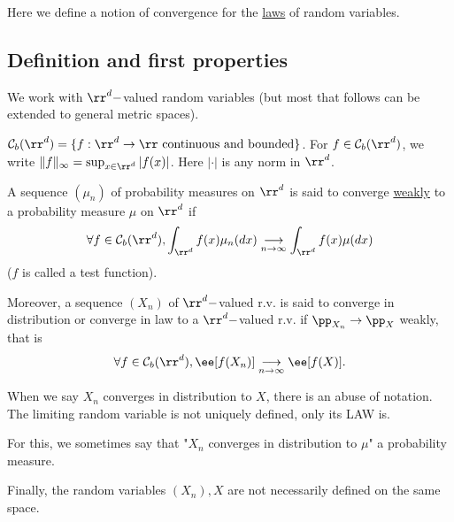 \documentclass[../main.tex]{subfiles}
\begin{document}
Here we define a notion of convergence for the \underline{laws} of random
variables.


\subsection{Definition and first properties}

We work with $\rr^d-$valued random variables (but most that follows can be
extended to general metric spaces).

\begin{notation}
  $\mathcal{C}_b(\rr^d) = \{ f: \rr^d \to \rr \text{ continuous and bounded}\}
  $. For $f \in \mathcal{C}_b(\rr^d)$, we write $\| f \|_{\infty} = \sup_{x
  \in \rr^d} |f(x)|$. Here $|\cdot|$ is any norm in $\rr^d$.
\end{notation}

\begin{definition}
  A sequence $(\mu_n)$ of probability measures on $\rr^d$ is said to converge
  \underline{weakly} to a probability measure $\mu$ on $\rr^d$ if $$\forall f
  \in \mathcal{C}_b(\rr^d), \int_{\rr^d} f(x)\mu_n(dx) \underset{n \to \infty}{\longrightarrow} \int_{\rr^d}
  f(x)\mu(dx) $$
  ($f$ is called a test function).

  Moreover, a sequence $(X_n)$ of $\rr^d-$valued r.v. is said to converge in
  distribution or converge in law to a $\rr^d-$valued r.v. if $\pp_{X_n} \to
  \pp_X$ weakly, that is
  \[
    \forall f \in \mathcal{C}_b(\rr^d), \ee[f(X_n)] \underset{n \to
    \infty}{\longrightarrow}\ee[f(X)]
  .\] 
\end{definition}
\begin{remark}
    When we say $X_n$ converges in distribution to $X$, there is an abuse of
    notation. The limiting random variable is not uniquely defined, only its
    LAW is.

    For this, we sometimes say that "$X_n$ converges in distribution to $\mu$"
    a probability measure.

    Finally, the random variables $(X_n), X$ are not necessarily defined on
    the same space.
\end{remark}
\end{document}
